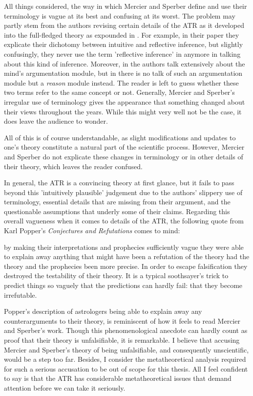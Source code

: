 All things considered, the way in which Mercier and Sperber define and use their terminology is vague at its best and confusing at its worst. The problem may partly stem from the authors revising certain details of the ATR as it developed into the full-fledged theory as expounded in \citet{MS17}.
For example, in their \citeyear{MS09} paper they explicate their dichotomy between intuitive and reflective inference, but slightly confusingly, they never use the term 'reflective inference' in \citet{MS11} anymore in talking about this kind of inference.
Moreover, in \citet{MS09} the authors talk extensively about the mind's argumentation module, but in \citet{MS17} there is no talk of such an argumentation module but a \emph{reason} module instead. The reader is left to guess whether these two terms refer to the same concept or not.
Generally, Mercier and Sperber's irregular use of terminology gives the appearance that something changed about their views throughout the years.
While this might very well not be the case, it does leave the audience to wonder.

All of this is of course understandable, as slight modifications and updates to one's theory constitute a natural part of the scientific process. However, Mercier and Sperber do not explicate these changes in terminology or in other details of their theory, which leaves the reader confused.

In general, the ATR is a convincing theory at first glance, but it fails to pass beyond this 'intuitively plausible' judgement due to the authors' slippery use of terminology, essential details that are missing from their argument, and the questionable assumptions that underly some of their claims.
Regarding this overall vagueness when it comes to details of the ATR, the following quote from Karl Popper's \emph{Conjectures and Refutations} comes to mind:
\begin{quoting}
    by making their interpretations and prophecies sufficiently vague they were able to explain away anything that might have been a refutation of the theory had the theory and the prophecies been more precise. In order to escape falsification they destroyed the testability of their theory. It is a typical soothsayer's trick to predict things so vaguely that the predictions can hardly fail: that they become irrefutable.
    \hfill \citep[p.~37]{Popper62}
\end{quoting}
Popper's description of astrologers being able to explain away any counterarguments to their theory, is reminiscent of how it feels to read Mercier and Sperber's work. Though this phenomenological anecdote can hardly count as proof that their theory is unfalsifiable, it is remarkable.
I believe that accusing Mercier and Sperber's theory of being unfalsifiable, and consequently unscientific, would be a step too far. Besides, I consider the metatheoretical analysis required for such a serious accusation to be out of scope for this thesis. All I feel confident to say is that the ATR has considerable metatheoretical issues that demand attention before we can take it seriously.

